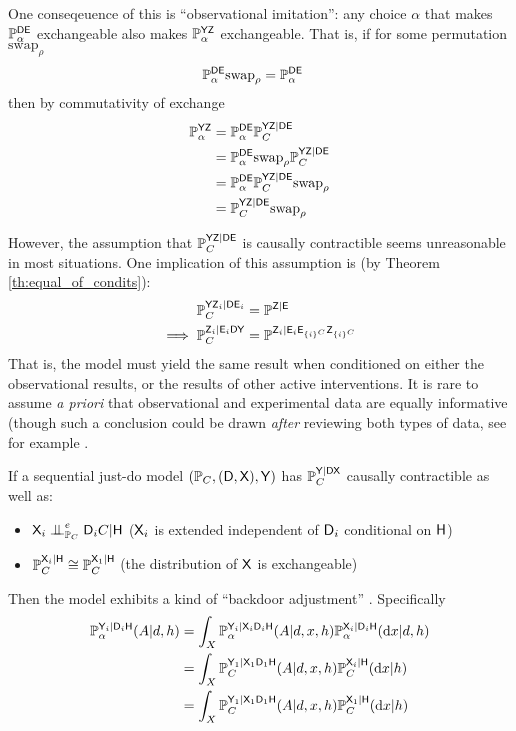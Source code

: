 One conseqeuence of this is ``observational imitation'': any choice $\alpha$ that makes $\mathbb{P}_\alpha^{\mathsf{D}\mathsf{E}}$ exchangeable also makes $\mathbb{P}_\alpha^{\mathsf{YZ}}$ exchangeable. That is, if for some permutation $\mathrm{swap}_\rho$
\begin{align}
    \mathbb{P}_\alpha^{\mathsf{DE}}\mathrm{swap}_\rho &= \mathbb{P}_\alpha^{\mathsf{DE}}
\end{align}
then by commutativity of exchange
\begin{align}
    \mathbb{P}_\alpha^{\mathsf{YZ}} &= \mathbb{P}_\alpha^{\mathsf{DE}} \mathbb{P}_C^{\mathsf{YZ}|\mathsf{DE}}\\
    &=  \mathbb{P}_\alpha^{\mathsf{DE}}\mathrm{swap}_\rho \mathbb{P}_C^{\mathsf{YZ}|\mathsf{DE}}\\
    &= \mathbb{P}_\alpha^{\mathsf{DE}} \mathbb{P}_C^{\mathsf{YZ}|\mathsf{DE}}\mathrm{swap}_\rho\\
    &= \mathbb{P}_C^{\mathsf{YZ}|\mathsf{DE}}\mathrm{swap}_\rho
\end{align}

However, the assumption that $\mathbb{P}_C^{\mathsf{YZ}|\mathsf{DE}}$ is causally contractible seems unreasonable in most situations. One implication of this assumption is (by Theorem \ref{th:equal_of_condits}):
\begin{align}
    \mathbb{P}^{\mathsf{Y}\mathsf{Z}_i|\mathsf{D}\mathsf{E}_i}_C &= \mathbb{P}^{\mathsf{Z}|\mathsf{E}}\\
    \implies \mathbb{P}^{\mathsf{Z}_i|\mathsf{E}_i\mathsf{D}\mathsf{Y}}_C &= \mathbb{P}^{\mathsf{Z}_{i}|\mathsf{E}_i\mathsf{E}_{\{i\}^C}\mathsf{Z}_{\{i\}^C}}
\end{align}
That is, the model must yield the same result when conditioned on either the observational results, or the results of other active interventions. It is rare to assume \emph{a priori} that observational and experimental data are equally informative (though such a conclusion could be drawn \emph{after} reviewing both types of data, see for example .

If a sequential just-do model $(\mathbb{P}_C,(\mathsf{D},\mathsf{X}),\mathsf{Y})$ has $\mathbb{P}_C^{\mathsf{Y}|\mathsf{DX}}$ causally contractible as well as:
\begin{itemize}
    \item $\RV{X}_{i}\CI^e_{\prob{P}_C}\RV{D}_{i}C|\RV{H}$ ($\mathsf{X}_i$ is extended independent of $\mathsf{D}_i$ conditional on $\mathsf{H}$)
    \item $\mathbb{P}_C^{\mathsf{X}_{i}|\mathsf{H}}\cong \mathbb{P}_C^{\mathsf{X}_{1}|\mathsf{H}}$ (the distribution of $\mathsf{X}$ is exchangeable)
 \end{itemize}
Then the model exhibits a kind of ``backdoor adjustment'' \citet[Chap. 1]{pearl_causality:_2009}. Specifically
\begin{align}
    \mathbb{P}_\alpha^{\mathsf{Y}_{i}|\mathsf{D}_{i}\mathsf{H}}(A|d,h) &= \int_X \mathbb{P}_\alpha^{\mathsf{Y}_{i}|\mathsf{X}_{i}\mathsf{D}_{i}\mathsf{H}}(A|d,x,h)\mathbb{P}_\alpha^{\mathsf{X}_{i}|\mathsf{D}_{i}\mathsf{H}}(\mathrm{d}x|d,h)\\
    &= \int_X \mathbb{P}_C^{\mathsf{Y}_{1}|\mathsf{X}_{1}\mathsf{D}_{1}\mathsf{H}}(A|d,x,h)\mathbb{P}_C^{\mathsf{X}_{i}|\mathsf{H}}(\mathrm{d}x|h)\\
    &= \int_X \mathbb{P}_C^{\mathsf{Y}_{1}|\mathsf{X}_{1}\mathsf{D}_{1}\mathsf{H}}(A|d,x,h)\mathbb{P}_C^{\mathsf{X}_{1}|\mathsf{H}}(\mathrm{d}x|h)\label{eq:backdoor}
\end{align}

